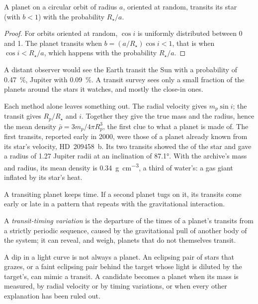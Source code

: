 \begin{proposition}\label{prop:b3:exoplanets:probability}
A planet on a circular orbit of radius $a$, oriented at random, transits
its star (with $b < 1$) with the probability $R_\star/a$.
\end{proposition}

\begin{proof}
For orbits oriented at random, $\cos i$ is uniformly distributed between
0 and 1. The planet transits when $b = (a/R_\star)\cos i < 1$, that is
when $\cos i < R_\star/a$, which happens with the probability $R_\star/a$.
\end{proof}

A distant observer would see the Earth transit the Sun with a probability
of \qty{0.47}{\percent}, Jupiter with \qty{0.09}{\percent}. A transit
survey sees only a small fraction of the planets around the stars it
watches, and mostly the close-in ones.

Each method alone leaves something out. The radial velocity gives
$m_p\sin i$; the transit gives $R_p/R_\star$ and $i$. Together they give
the true mass and the radius, hence the mean density
$\bar\rho = 3m_p/4\pi R_p^3$, the first clue to what a planet is made of.
The first transits, reported early in 2000, were those of a planet
already known from its star's velocity, HD~209458~b. Its two transits
showed the  of the star and gave a radius of 1.27 Jupiter radii at an inclination of
\ang{87.1}. With the archive's mass and radius, its mean density is
\qty{0.34}{g.cm^{-3}}, a third of water's: a gas giant inflated by its
star's heat.

A transiting planet keeps time. If a second planet tugs on it, its
transits come early or late in a pattern that repeats with the
gravitational interaction.

\begin{definition}\label{def:b3:exoplanets:ttv}
A \emph{transit-timing variation} is the
departure of the times of a planet's transits from a strictly periodic
sequence, caused by the gravitational pull of another body of the
system; it can reveal, and weigh, planets that do not themselves
transit.
\end{definition}

A dip in a light curve is not always a planet. An eclipsing pair of
stars that grazes, or a faint eclipsing pair behind the target whose
light is diluted by the target's, can mimic a transit. A candidate becomes
a planet when its mass is measured, by radial velocity or by timing
variations, or when every other explanation has been ruled out.

